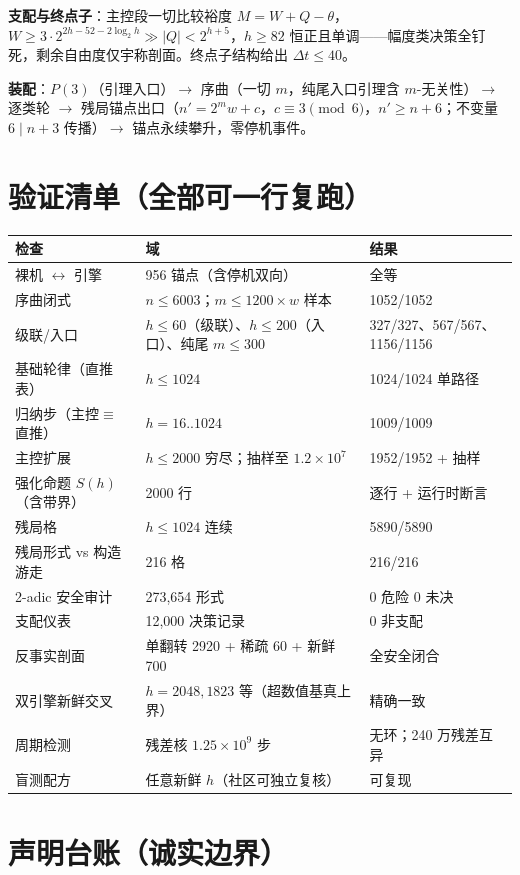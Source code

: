 \documentclass[11pt]{ctexart}
\theoremstyle{definition}
\begin{document}
\textbf{支配与终点子}：主控段一切比较裕度 $M=W+Q-\theta$，$W\ge 3\cdot 2^{2h-52-2\log_2 h}\gg|Q|<2^{h+5}$，$h\ge 82$ 恒正且单调——幅度类决策全钉死，剩余自由度仅宇称剖面。终点子结构给出 $\Delta t\le 40$。

\textbf{装配}：$P(3)$（引理入口）$\to$ 序曲（一切 $m$，纯尾入口引理含 $m$-无关性）$\to$ 逐类轮 $\to$ 残局锚点出口（$n'=2^{m}w+c$，$c\equiv 3\pmod 6$，$n'\ge n+6$；不变量 $6\mid n+3$ 传播）$\to$ 锚点永续攀升，零停机事件。

\section{验证清单（全部可一行复跑）}

\begin{table}[h]
\centering\small
\begin{tabular}{lll}
\toprule
检查 & 域 & 结果\\
\midrule
裸机 $\leftrightarrow$ 引擎 & 956 锚点（含停机双向） & 全等\\
序曲闭式 & $n\le 6003$；$m\le 1200\times w$ 样本 & 1052/1052\\
级联/入口 & $h\le 60$（级联）、$h\le 200$（入口）、纯尾 $m\le 300$ & 327/327、567/567、1156/1156\\
基础轮律（直推表） & $h\le 1024$ & 1024/1024 单路径\\
归纳步（主控$\equiv$直推） & $h=16..1024$ & 1009/1009\\
主控扩展 & $h\le 2000$ 穷尽；抽样至 $1.2\times10^7$ & 1952/1952 + 抽样\\
强化命题 $S(h)$（含带界） & 2000 行 & 逐行 + 运行时断言\\
残局格 & $h\le 1024$ 连续 & 5890/5890\\
残局形式 vs 构造游走 & 216 格 & 216/216\\
2-adic 安全审计 & 273{,}654 形式 & 0 危险 0 未决\\
支配仪表 & 12{,}000 决策记录 & 0 非支配\\
反事实剖面 & 单翻转 2920 + 稀疏 60 + 新鲜 700 & 全安全闭合\\
双引擎新鲜交叉 & $h=2048,1823$ 等（超数值基真上界） & 精确一致\\
周期检测 & 残差核 $1.25\times10^9$ 步 & 无环；240 万残差互异\\
盲测配方 & 任意新鲜 $h$（社区可独立复核） & 可复现\\
\bottomrule
\end{tabular}
\end{table}

\section{声明台账（诚实边界）}\label{sec:ledger}
\end{document}

